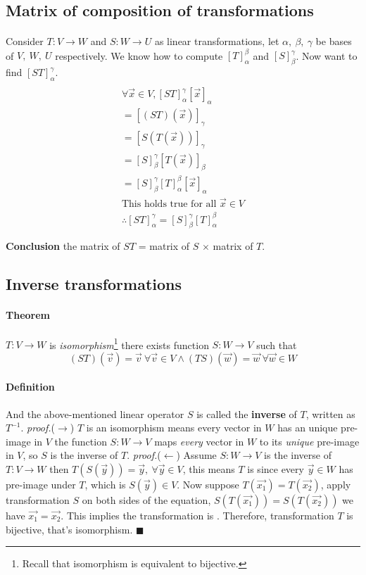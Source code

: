 \documentclass[11pt]{article}
\newcommand{\trans}[3]{{#1}: {#2} \to {#3}}
\newcommand{\coor}[2]{[\vec{{#1}}]_{{#2}}}
\newcommand{\tmat}[3]{[{#1}]_{{#2}}^{{#3}}}
\newcommand{\definition}[0]{\paragraph{Definition}}
\newcommand{\theorem}[0]{\paragraph{Theorem}}
\begin{document}
	\subsection{Matrix of composition of transformations}
	\paragraph{} Consider $\trans{T}{V}{W}$ and $\trans{S}{W}{U}$ as linear transformations, let $\alpha,\ \beta,\ \gamma$ be bases of $V,\ W,\ U$ respectively.
	\newline We know how to compute $\tmat{T}{\alpha}{\beta}$ and $\tmat{S}{\beta}{\gamma}$. Now want to find $\tmat{ST}{\alpha}{\gamma}$.
	\begin{multline*}
	\\
	\forall \vec{x} \in V, \tmat{ST}{\alpha}{\gamma} \coor{x}{\alpha} \\
	= [(ST)(\vec{x})]_{\gamma} \\
	= [S(T(\vec{x}))]_{\gamma} \\
	= \tmat{S}{\beta}{\gamma} [T(\vec{x})]_\beta \\
	= \tmat{S}{\beta}{\gamma} \tmat{T}{\alpha}{\beta} \coor{x}{\alpha} \\
	\text{This holds true for all }\vec{x} \in V \\
	\therefore \tmat{ST}{\alpha}{\gamma} = \tmat{S}{\beta}{\gamma} \tmat{T}{\alpha}{\beta} \\
	\\
	\end{multline*}
	\textbf{Conclusion} the matrix of $ST$ = matrix of $S$ $\times$ matrix of $T$.
	
	\subsection{Inverse transformations}
	\theorem $\trans{T}{V}{W}$ is \emph{isomorphism}\footnote{Recall that isomorphism is equivalent to bijective.}  there exists function $\trans{S}{W}{V}$ such that
	\[
		(ST)(\vec{v}) = \vec{v}\ \forall \vec{v} \in V \land (TS)(\vec{w}) = \vec{w}\ \forall \vec{w} \in W
	\]
	\definition And the above-mentioned linear operator $S$ is called the \textbf{inverse} of $T$, written as $T^{-1}$.
	\newline \quad
	\newline \emph{proof.}($\rightarrow$) $T$ is an isomorphism means every vector in $W$ has an unique pre-image in $V$ the function $\trans{S}{W}{V}$ maps \emph{every} vector in $W$ to its \emph{unique} pre-image in $V$, so $S$ is the inverse of $T$.
	\newline \quad
	\newline \emph{proof.}($\leftarrow$) Assume $\trans{S}{W}{V}$ is the inverse of $\trans{T}{V}{W}$ then $T(S(\vec{y})) = \vec{y},\ \forall \vec{y} \in V$, this means $T$ is  since every $\vec{y} \in W$ has pre-image under $T$, which is $S(\vec{y}) \in V$. Now suppose $T(\vec{x_1}) = T(\vec{x_2})$, apply transformation $S$ on both sides of the equation, $S(T(\vec{x_1})) = S(T(\vec{x_2	}))$ we have $\vec{x_1} = \vec{x_2}$. This implies the transformation is . Therefore, transformation $T$ is bijective, that's isomorphism.	\hfill$\blacksquare$
\end{document}
